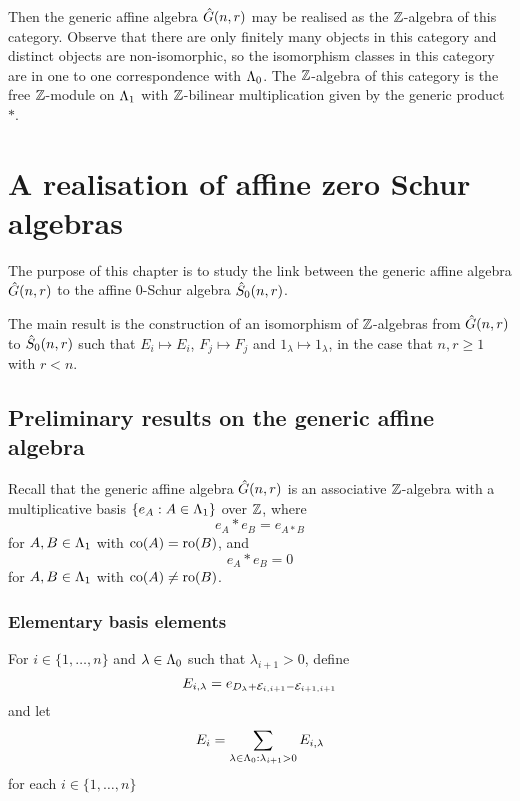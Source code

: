 \documentclass[a4paper, 11pt]{report}
\begin{document}
Then the generic affine algebra $\hat{G}(n,r)$ may be realised as the $\mathbb{Z}$-algebra of this category. Observe that there are only finitely many objects in this category and distinct objects are non-isomorphic, so the isomorphism classes in this category are in one to one correspondence with $\Lambda_0{}$. The $\mathbb{Z}$-algebra of this category is the free $\mathbb{Z}$-module on $\Lambda_1{}$ with $\mathbb{Z}$-bilinear multiplication given by the generic product $\ast$.



\chapter{A realisation of affine zero Schur algebras}

The purpose of this chapter is to study the link between the generic affine algebra $\hat{G}(n,r)$ to the affine $0$-Schur algebra $\hat{S}_0(n,r)$.

The main result is the construction of an isomorphism of $\mathbb{Z}$-algebras from $\hat{G}(n,r)$ to $\hat{S}_0(n,r)$ such that $E_i\mapsto E_i$, $F_j\mapsto F_j$ and $1_\lambda\mapsto 1_\lambda$, in the case that $n,r\geq 1$ with $r<n$.

\section{Preliminary results on the generic affine algebra}

Recall that the generic affine algebra $\hat{G}(n,r)$ is an associative $\mathbb{Z}$-algebra with a multiplicative basis $\{e_A:A\in\Lambda_1{}\}$ over $\mathbb{Z}$, where
\begin{equation*}
e_A\ast e_B = e_{A\ast B}
\end{equation*}
for $A,B\in\Lambda_1{}$ with $\operatorname{co}(A)=\operatorname{ro}(B)$, and
\begin{equation*}
e_A\ast e_B = 0
\end{equation*}
for $A,B\in\Lambda_1{}$ with $\operatorname{co}(A)\neq\operatorname{ro}(B)$.

\subsection{Elementary basis elements}

For $i\in\{1,\ldots,n\}$ and $\lambda\in\Lambda_0{}$ such that $\lambda_{i+1}>0$, define
\begin{equation*}
E_{i,\lambda} = e_{D_\lambda + \mathcal{E}_{i,i+1} - \mathcal{E}_{i+1,i+1}}
\end{equation*}
and let
\begin{equation*}
E_i = \sum_{\lambda\in\Lambda_0{}:\lambda_{i+1}>0} E_{i,\lambda}
\end{equation*}
for each $i\in\{1,\ldots,n\}$
\end{document}
